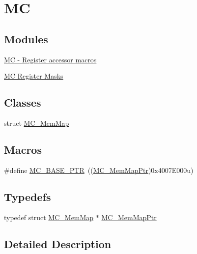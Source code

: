 \hypertarget{group___m_c___peripheral}{}\section{MC}
\label{group___m_c___peripheral}
\subsection*{Modules}
\begin{DoxyCompactItemize}
\item 
\hyperlink{group___m_c___register___accessor___macros}{M\+C -\/ Register accessor macros}
\item 
\hyperlink{group___m_c___register___masks}{M\+C Register Masks}
\end{DoxyCompactItemize}
\subsection*{Classes}
\begin{DoxyCompactItemize}
\item 
struct \hyperlink{struct_m_c___mem_map}{M\+C\+\_\+\+Mem\+Map}
\end{DoxyCompactItemize}
\subsection*{Macros}
\begin{DoxyCompactItemize}
\item 
\#define \hyperlink{group___m_c___peripheral_gaaceb8e18ec89863925b35b4e058bcd7e}{M\+C\+\_\+\+B\+A\+S\+E\+\_\+\+P\+TR}~((\hyperlink{group___m_c___peripheral_gaf8e0db4524de5478847695b38cd4d570}{M\+C\+\_\+\+Mem\+Map\+Ptr})0x4007\+E000u)
\end{DoxyCompactItemize}
\subsection*{Typedefs}
\begin{DoxyCompactItemize}
\item 
typedef struct \hyperlink{struct_m_c___mem_map}{M\+C\+\_\+\+Mem\+Map} $\ast$ \hyperlink{group___m_c___peripheral_gaf8e0db4524de5478847695b38cd4d570}{M\+C\+\_\+\+Mem\+Map\+Ptr}
\end{DoxyCompactItemize}


\subsection{Detailed Description}


